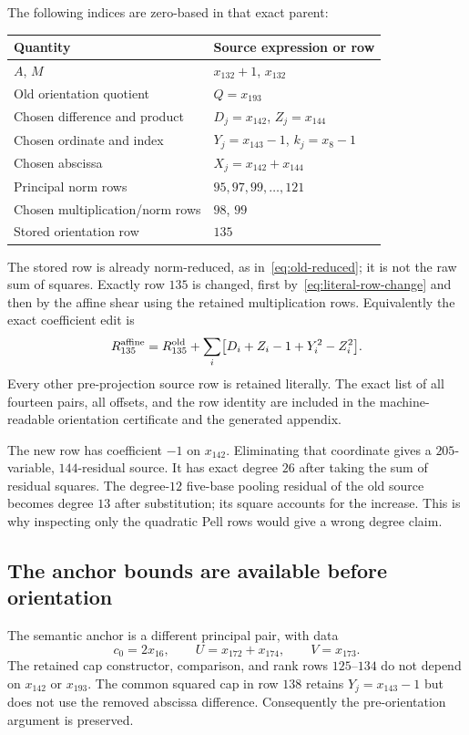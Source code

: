 \documentclass[11pt,letterpaper]{article}
\theoremstyle{definition}\newtheorem{definition}[theorem]{Definition}
\theoremstyle{remark}\newtheorem{remark}[theorem]{Remark}
\begin{document}
The following indices are zero-based in that exact parent:
\begin{center}
\begin{tabular}{ll}\toprule
Quantity&Source expression or row\\\midrule
$A$, $M$&$x_{132}+1$, $x_{132}$\\
Old orientation quotient&$Q=x_{193}$\\
Chosen difference and product&$D_j=x_{142}$, $Z_j=x_{144}$\\
Chosen ordinate and index&$Y_j=x_{143}-1$, $k_j=x_8-1$\\
Chosen abscissa&$X_j=x_{142}+x_{144}$\\
Principal norm rows&$95,97,99,\ldots,121$\\
Chosen multiplication/norm rows&$98$, $99$\\
Stored orientation row&$135$\\\bottomrule
\end{tabular}
\end{center}
The stored row is already norm-reduced, as in~\eqref{eq:old-reduced}; it is not the raw sum of squares. Exactly row $135$ is changed, first by~\eqref{eq:literal-row-change} and then by the affine shear using the retained multiplication rows. Equivalently the exact coefficient edit is
\[
R_{135}^{\rm affine}=R_{135}^{\rm old}
+\sum_i\bigl[D_i+Z_i-1+Y_i^2-Z_i^2\bigr].
\]
Every other pre-projection source row is retained literally. The exact list of all fourteen pairs, all offsets, and the row identity are included in the machine-readable orientation certificate and the generated appendix.

The new row has coefficient $-1$ on $x_{142}$. Eliminating that coordinate gives a $205$-variable, $144$-residual source. It has exact degree $26$ after taking the sum of residual squares. The degree-$12$ five-base pooling residual of the old source becomes degree $13$ after substitution; its square accounts for the increase. This is why inspecting only the quadratic Pell rows would give a wrong degree claim.

\subsection{The anchor bounds are available before orientation}
The semantic anchor is a different principal pair, with data
\[
c_0=2x_{16},\qquad U=x_{172}+x_{174},\qquad V=x_{173}.
\]
The retained cap constructor, comparison, and rank rows $125$--$134$ do not depend on $x_{142}$ or $x_{193}$. The common squared cap in row $138$ retains $Y_j=x_{143}-1$ but does not use the removed abscissa difference. Consequently the pre-orientation argument is preserved.
\end{document}
